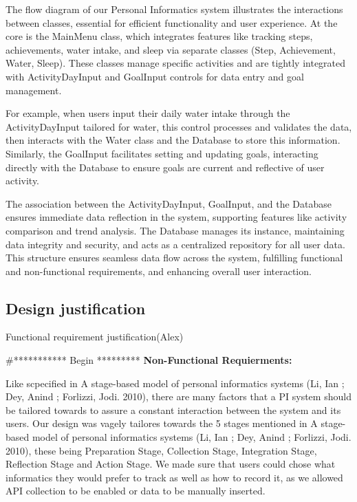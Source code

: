 \documentclass[12pt]{article}
\begin{document}
The flow diagram of our Personal Informatics system illustrates the interactions between classes, essential for efficient functionality and user experience. At the core is the MainMenu class, which integrates features like tracking steps, achievements, water intake, and sleep via separate classes (Step, Achievement, Water, Sleep). These classes manage specific activities and are tightly integrated with ActivityDayInput and GoalInput controls for data entry and goal management.\par

For example, when users input their daily water intake through the ActivityDayInput tailored for water, this control processes and validates the data, then interacts with the Water class and the Database to store this information. Similarly, the GoalInput facilitates setting and updating goals, interacting directly with the Database to ensure goals are current and reflective of user activity.\par

The association between the ActivityDayInput, GoalInput, and the Database ensures immediate data reflection in the system, supporting features like activity comparison and trend analysis. The Database manages its instance, maintaining data integrity and security, and acts as a centralized repository for all user data. This structure ensures seamless data flow across the system, fulfilling functional and non-functional requirements, and enhancing overall user interaction.\par

\subsection{Design justification}
Functional requirement justification(Alex)

#*********** Begin *********
\textbf{Non-Functional Requierments:}

Like scpecified in A stage-based model of personal informatics systems (Li, Ian ; Dey, Anind ; Forlizzi, Jodi.  2010),  there are many factors that a PI system should be tailored towards to assure a constant interaction between the system and its users.  Our design was vagely tailores towards the 5 stages mentioned in A stage-based model of personal informatics systems (Li, Ian ; Dey, Anind ; Forlizzi, Jodi.  2010), these being Preparation Stage,  Collection Stage, Integration Stage,  Reflection Stage and Action Stage.  We made sure that users could chose what informatics they would prefer to track as well as how to record it, as we allowed API collection to be enabled or data to be manually inserted.\\
\end{document}
